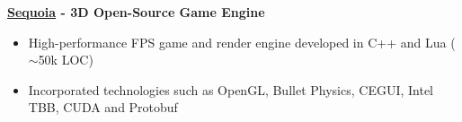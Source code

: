\textbf{\href{https://github.com/thfabian/sequoia}{Sequoia} - 3D Open-Source Game Engine}
\begin{itemize}
 \item High-performance FPS game and render engine developed in C++ and Lua ($\sim$50k LOC)
 \item Incorporated technologies such as OpenGL, Bullet Physics, CEGUI, Intel TBB, CUDA and Protobuf
\end{itemize}